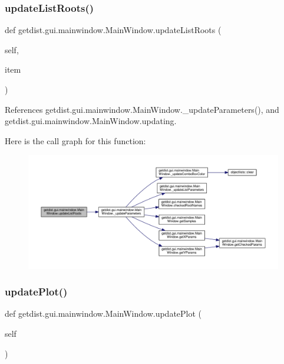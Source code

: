 \subsubsection{\texorpdfstring{update\+List\+Roots()}{updateListRoots()}}
{\footnotesize\ttfamily def getdist.\+gui.\+mainwindow.\+Main\+Window.\+update\+List\+Roots (\begin{DoxyParamCaption}\item[{}]{self,  }\item[{}]{item }\end{DoxyParamCaption})}



References getdist.\+gui.\+mainwindow.\+Main\+Window.\+\_\+update\+Parameters(), and getdist.\+gui.\+mainwindow.\+Main\+Window.\+updating.

Here is the call graph for this function\+:
\nopagebreak
\begin{figure}[H]
\begin{center}
\leavevmode
\includegraphics[width=350pt]{classgetdist_1_1gui_1_1mainwindow_1_1MainWindow_ad510d3ac614da224ce874b5e905ff51c_cgraph}
\end{center}
\end{figure}
\mbox{\label{classgetdist_1_1gui_1_1mainwindow_1_1MainWindow_ae40013ba1fe1b4e96660b96f63fe1c8a}} 
\subsubsection{\texorpdfstring{update\+Plot()}{updatePlot()}}
{\footnotesize\ttfamily def getdist.\+gui.\+mainwindow.\+Main\+Window.\+update\+Plot (\begin{DoxyParamCaption}\item[{}]{self }\end{DoxyParamCaption})}



